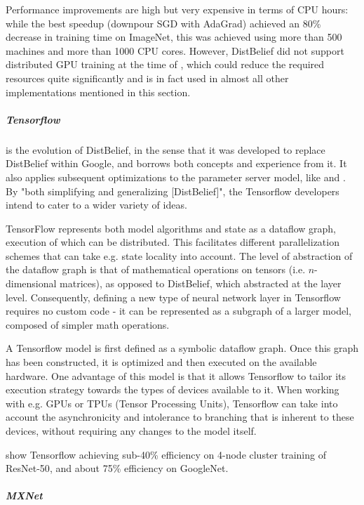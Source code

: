 Performance improvements are high but very expensive in terms of CPU hours: while the best speedup (downpour SGD with AdaGrad) achieved an 80\% decrease in training time on ImageNet, this was achieved using more than 500 machines and more than 1000 CPU cores. However, DistBelief did not support distributed GPU training at the time of \citet{DistBelief2012}, which could reduce the required resources quite significantly and is in fact used in almost all other implementations mentioned in this section.

\subparagraph{Tensorflow \citep{Tensorflow2015}\citep{Tensorflow2016}}

is the evolution of DistBelief, in the sense that it was developed to replace DistBelief within Google, and borrows both concepts and experience from it. It also applies subsequent optimizations to the parameter server model, like \citet{Chilimbi14} and \citet{Li2014Comms}\citep{Li2014Scaling}. By "both simplifying and generalizing [DistBelief]"\citep{Tensorflow2016}, the Tensorflow developers intend to cater to a wider variety of ideas.

TensorFlow represents both model algorithms and state as a dataflow graph, execution of which can be distributed. This facilitates different parallelization schemes that can take e.g. state locality into account. The level of abstraction of the dataflow graph is that of mathematical operations on tensors (i.e. $n$-dimensional matrices), as opposed to DistBelief, which abstracted at the layer level. Consequently, defining a new type of neural network layer in Tensorflow requires no custom code - it can be represented as a subgraph of a larger model, composed of simpler math operations.

A Tensorflow model is first defined as a symbolic dataflow graph. Once this graph has been constructed, it is optimized and then executed on the available hardware. One advantage of this model is that it allows Tensorflow to tailor its execution strategy towards the types of devices available to it. When working with e.g. GPUs or TPUs (Tensor Processing Units\citep{TPU2017}), Tensorflow can take into account the asynchronicity and intolerance to branching that is inherent to these devices, without requiring any changes to the model itself.

\citet{Shaohuai2017} show Tensorflow achieving sub-40\% efficiency on 4-node cluster training of ResNet-50\citet{He2015}, and about 75\% efficiency on GoogleNet\citep{Szegedy2014}. 


\subparagraph{MXNet \citep{MXNet2015}}

